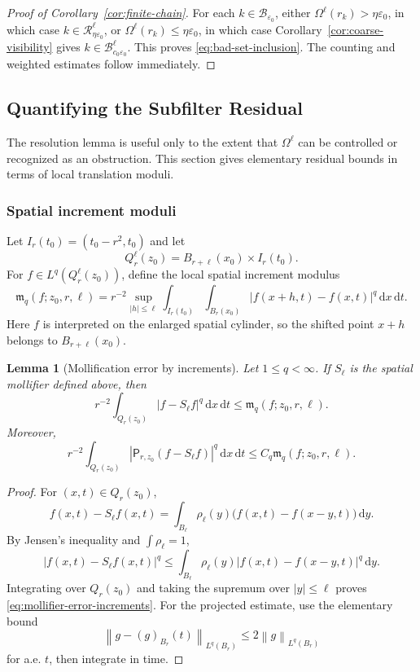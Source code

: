 \documentclass[10pt,a4paper]{amsart}
\numberwithin{equation}{section}
\newtheorem{lemma}[theorem]{Lemma}
\newcommand{\eps}{\varepsilon}
\newcommand{\dxdt}{\,\mathrm dx\,\mathrm dt}
\newcommand{\dy}{\,\mathrm dy}
\newcommand{\norm}[2]{\left\lVert #1\right\rVert_{#2}}
\newcommand{\Pf}{\mathsf P}
\begin{document}
\begin{proof}[Proof of Corollary~\ref{cor:finite-chain}]
For each $k\in\mathcal B_{\eps_0}$, either $\Omega^\ell(r_k)>\eta\eps_0$, in which case $k\in\mathcal R^\ell_{\eta\eps_0}$, or $\Omega^\ell(r_k)\le\eta\eps_0$, in which case Corollary~\ref{cor:coarse-visibility} gives $k\in\mathcal B^\ell_{c_0\eps_0}$.  This proves \eqref{eq:bad-set-inclusion}.  The counting and weighted estimates follow immediately.
\end{proof}
\subsection{Quantifying the Subfilter Residual}

The resolution lemma is useful only to the extent that $\Omega^\ell$ can be controlled or recognized as an obstruction.  This section gives elementary residual bounds in terms of local translation moduli.

\subsubsection{Spatial increment moduli}

Let $I_r(t_0)=(t_0-r^2,t_0)$ and let
\[
Q_r^\ell(z_0)=B_{r+\ell}(x_0)\times I_r(t_0).
\]
For $f\in L^q(Q_r^\ell(z_0))$, define the local spatial increment modulus
\begin{equation}\label{eq:increment-modulus}
\mathfrak m_q(f;z_0,r,\ell)=
r^{-2}\sup_{|h|\le\ell}\int_{I_r(t_0)}\int_{B_r(x_0)}
|f(x+h,t)-f(x,t)|^q\dxdt.
\end{equation}
Here $f$ is interpreted on the enlarged spatial cylinder, so the shifted point $x+h$ belongs to $B_{r+\ell}(x_0)$.

\begin{lemma}[Mollification error by increments]\label{lem:mollifier-increments}
Let $1\le q<\infty$.  If $S_\ell$ is the spatial mollifier defined above, then
\begin{equation}\label{eq:mollifier-error-increments}
r^{-2}\int_{Q_r(z_0)}|f-S_\ell f|^q\dxdt
\le
\mathfrak m_q(f;z_0,r,\ell).
\end{equation}
Moreover,
\begin{equation}\label{eq:projected-mollifier-error-increments}
r^{-2}\int_{Q_r(z_0)}|\Pf_{r,z_0}(f-S_\ell f)|^q\dxdt
\le
C_q\mathfrak m_q(f;z_0,r,\ell).
\end{equation}
\end{lemma}

\begin{proof}
For $(x,t)\in Q_r(z_0)$,
\[
f(x,t)-S_\ell f(x,t)=\int_{B_\ell}\rho_\ell(y)\bigl(f(x,t)-f(x-y,t)\bigr)\dy.
\]
By Jensen's inequality and $\int\rho_\ell=1$,
\[
|f(x,t)-S_\ell f(x,t)|^q
\le
\int_{B_\ell}\rho_\ell(y)|f(x,t)-f(x-y,t)|^q\dy.
\]
Integrating over $Q_r(z_0)$ and taking the supremum over $|y|\le\ell$ proves \eqref{eq:mollifier-error-increments}.  For the projected estimate, use the elementary bound
\[
\norm{g-(g)_{B_r}(t)}{L^q(B_r)}\le 2\norm{g}{L^q(B_r)}
\]
for a.e. $t$, then integrate in time.
\end{proof}
\end{document}
